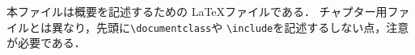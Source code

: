 本ファイルは概要を記述するための \LaTeX ファイルである．
チャプター用ファイルとは異なり，先頭に\texttt{\textbackslash documentclass}や
\texttt{\textbackslash include}を記述するしない点，注意が必要である．